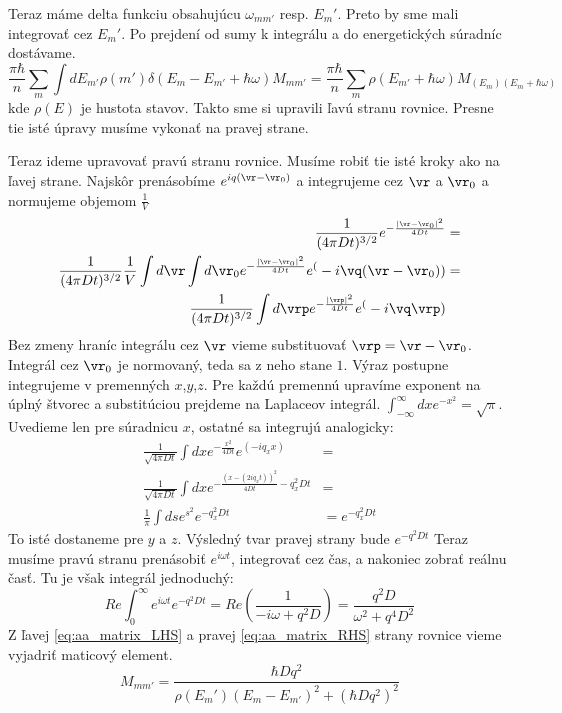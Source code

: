 Teraz máme delta funkciu obsahujúcu $\omega_{mm'}$ resp. $E_m'$. Preto by sme mali integrovať cez $E_m'$. Po prejdení od sumy k integrálu a do energetických
súradníc dostávame.
\begin{equation}
 \frac{\pi \hbar}{n}\sum_m \int dE_{m'} \rho(m') \delta(E_m-E_{m'}+\hbar \omega) M_{mm'}=\frac{\pi \hbar}{n}\sum_m \rho(E_{m'}+\hbar\omega)M_{(E_m)(E_m+\hbar\omega)}
\end{equation}
kde $\rho(E)$ je hustota stavov. Takto sme si upravili ľavú stranu rovnice. Presne tie isté úpravy musíme vykonať na pravej strane.

Teraz ideme upravovať pravú stranu rovnice. Musíme robiť tie isté kroky ako na ľavej strane. Najskôr prenásobíme $e^{iq(\vr-\vr_0)}$ a integrujeme cez $\vr$ a $\vr_0$
a normujeme objemom $\frac{1}{V}$
\begin{align*}
 \frac{1}{(4\pi Dt)^{3/2}}e^{-\frac{|\vr-\vr_0|^2}{4Dt}}&=\\
 \frac{1}{(4\pi Dt)^{3/2}}\frac{1}{V} \int d\vr \int d\vr_0 e^{-\frac{|\vr-\vr_0|^2}{4Dt}}e^(-i\vq(\vr-\vr_0))&=\\
 \frac{1}{(4\pi Dt)^{3/2}}\int d\vrp e^{-\frac{|\vrp|^2}{4Dt}}e^(-i\vq \vrp)
\end{align*}
Bez zmeny hraníc integrálu cez $\vr$ vieme substituovať $\vrp=\vr-\vr_0$. Integrál cez $\vr_0$ je normovaný, teda sa z neho stane $1$.
Výraz postupne integrujeme v premenných $x$,$y$,$z$. Pre každú premennú upravíme exponent na úplný štvorec a substitúciou prejdeme na Laplaceov integrál.
$\int_{-\infty}^{\infty} dx e^{-x^2}=\sqrt{\pi}$. Uvedieme len pre súradnicu $x$, ostatné sa integrujú analogicky:
\begin{align*}
  \frac{1}{\sqrt{4\pi Dt}}\int dx e^{-\frac{x^2}{4Dt}}e^(-iq_x x)&=\\
  \frac{1}{\sqrt{4\pi Dt}}\int dx e^{-\frac{(x-(2iq_xt))^2}{4Dt}-q_x^2Dt}&=\\
  \frac{1}{\pi}\int ds e^{s^2} e^{-q_x^2Dt}&= e^{-q_x^2Dt}
\end{align*}
To isté dostaneme pre $y$ a $z$. Výsledný tvar pravej strany bude $e^{-q^2Dt}$
Teraz musíme pravú stranu prenásobiť $e^{i\omega t}$, integrovať cez čas, a nakoniec zobrať reálnu časť. Tu je však integrál jednoduchý:
\begin{equation}
\label{eq:aa_matrix_RHS}
 Re{\int_0^{\infty} e^{i\omega t}e^{-q^2Dt}}=Re(\frac{1}{-i\omega+q^2D})=\frac{q^2D}{\omega^2+q^4D^2}
\end{equation}
Z ľavej \eqref{eq:aa_matrix_LHS} a pravej \eqref{eq:aa_matrix_RHS} strany rovnice vieme vyjadriť maticový element.
\begin{equation}
 \label{eq:aa_matrix_element_final}
 M_{mm'}=\frac{\hbar D q^2}{\rho(E_m')(E_m-E_{m'})^2+(\hbar Dq^2)^2}
\end{equation}


